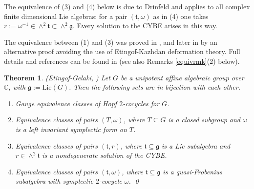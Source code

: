 \documentclass{amsart}
\numberwithin{equation}{section}
\newtheorem{theorem}{Theorem}[section]
\theoremstyle{definition}
\begin{document}
The equivalence of (3) and (4) below is due to Drinfeld \cite{Dr} and applies to all complex finite dimensional Lie algebras: for a pair $(\mathfrak{t},\omega)$ as in (4) one takes $r := \omega^{-1} \in \wedge^2\mathfrak{t} \subset \wedge^2 \mathfrak{g}$. Every solution to the CYBE arises in this way.

The equivalence between (1) and (3) was proved in \cite[Theorem 3.2]{EG6}, and later in \cite[Theorem 5.1]{G1} by an alternative proof avoiding the use of Etingof-Kazhdan deformation theory. Full details and references can be found in \cite[$\S$5]{G1} (see also Remarks \ref{equivrmk}(2) below).

\begin{theorem}\label{classify}{\rm ({\rm Etingof-Gelaki}, \cite{EG6})} Let $G$ be a unipotent affine algebraic group over $\mathbb{C}$, with $\mathfrak{g}:=\mathrm{Lie}(G)$. Then the following sets are in bijection with each other.
\begin{enumerate}
\item Gauge equivalence classes of Hopf $2$-cocycles for $G$.
\item Equivalence classes of pairs $(T, \omega)$, where $T\subseteq G$ is a closed subgroup and $\omega$ is a left invariant symplectic form on $T$.
\item Equivalence classes of pairs $(\mathfrak{t},r)$, where $\mathfrak{t}\subseteq \mathfrak{g}$ is a Lie subalgebra and $r \in \wedge^2\mathfrak{t}$ is a nondegenerate solution of the CYBE.
\item Equivalence classes of pairs $(\mathfrak{t},\omega)$, where $\mathfrak{t}\subseteq \mathfrak{g}$ is a quasi-Frobenius subalgebra with symplectic $2$-cocycle $\omega$. \qed
\end{enumerate}
\end{theorem} 
\end{document}
